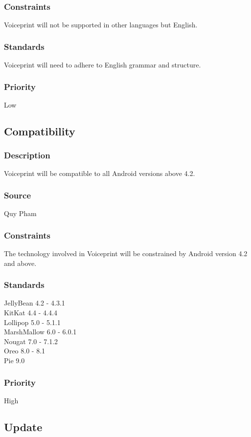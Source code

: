 \subsubsection{Constraints}
Voiceprint will not be supported in other languages but English.
\subsubsection{Standards}
Voiceprint will need to adhere to English grammar and structure.
\subsubsection{Priority}
Low

\subsection{Compatibility}
\subsubsection{Description}
Voiceprint will be compatible to all Android versions above 4.2.
\subsubsection{Source}
Quy Pham
\subsubsection{Constraints}
The technology involved in Voiceprint will be constrained by Android version 4.2 and above. 
\subsubsection{Standards}
JellyBean 4.2 - 4.3.1 \\
KitKat 4.4 - 4.4.4 \\
Lollipop 5.0 - 5.1.1 \\
MarshMallow 6.0 - 6.0.1 \\
Nougat 7.0 - 7.1.2 \\
Oreo 8.0 - 8.1 \\
Pie 9.0 \\
\subsubsection{Priority}
High

\subsection{Update}
